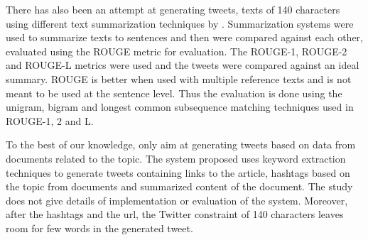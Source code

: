 There has also been an attempt at generating tweets, texts of 140 characters using different text summarization techniques by  . Summarization systems were used to summarize texts to sentences and then were compared against each other, evaluated using the ROUGE metric for evaluation. The ROUGE-1, ROUGE-2 and ROUGE-L metrics were used and the tweets were compared against an ideal summary. ROUGE is better when used with multiple reference texts and is not meant to be used at the sentence level. Thus the evaluation is done using the unigram, bigram and longest common subsequence matching techniques used in ROUGE-1, 2 and L.  

To the best of our knowledge, only  aim at generating tweets based on data from documents related to the topic. The system proposed uses keyword extraction techniques to generate tweets containing links to the article, hashtags based on the topic from documents and summarized content of the document. The study does not give details of implementation or evaluation of the system. Moreover, after the hashtags and the url, the Twitter constraint of 140 characters leaves room for few words in the generated tweet.